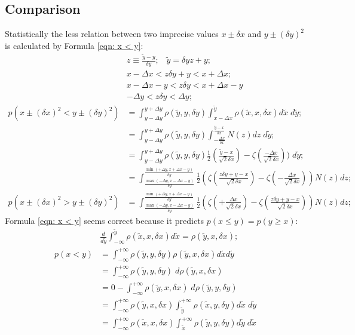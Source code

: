 \documentclass[twoside]{article}
\numberwithin{equation}{section}
\newcommand{\eqspace}{\;\;\;}
\begin{document}
\subsection{Comparison}

\iffalse

Statistically the less relation between two imprecise values $x \pm \delta x$ and $y \pm (\delta y)^2$ is calculated by Formula \ref{eqn: x < y}:
\begin{align}
& z \equiv \frac{\tilde{y} - y}{\delta y}; \eqspace \tilde{y} = \delta y z + y; \\
& x - \Delta x < z \delta y + y < x + \Delta x; \\ & x - \Delta x - y < z \delta y < x + \Delta x - y \\
& - \Delta y < z \delta y < \Delta y; \\
p\left( x \pm (\delta x)^2 < y \pm (\delta y)^2 \right) & = 
  \int_{y - \Delta y}^{y + \Delta y} \rho(\tilde{y}, y, \delta y) 
    \int_{x - \Delta x}^{\tilde{y}} \rho(\tilde{x}, x, \delta x) d \tilde{x} \;d \tilde{y}; \\
& = \int_{y - \Delta y}^{y + \Delta y} \rho(\tilde{y}, y, \delta y) 
  \int_{-\frac{\Delta x}{\delta x}}^{\frac{\tilde{y} - x}{\delta x}} N(z) d z \;d \tilde{y}; \\
& = \int_{y - \Delta y}^{y + \Delta y} \rho(\tilde{y}, y, \delta y) 
      \frac{1}{2}(\frac{\tilde{y} - x}{\sqrt{2} \delta x}) - \zeta(\frac{-\Delta x}{\sqrt{2} \delta x})) \;d \tilde{y}; \\
& = \int_{\frac{\max(-\Delta y, x - \Delta x - y)}{\delta y}}^{\frac{\min(+\Delta y, x + \Delta x - y)}{\delta y}} 
      \frac{1}{2} \left(\zeta(\frac{z \delta y + y - x}{\sqrt{2} \delta x}) - \zeta(-\frac{\Delta x}{\sqrt{2} \delta x})\right) N(z) d z; \\
p\left( x \pm (\delta x)^2 > y \pm (\delta y)^2 \right) & =     
   \int_{\frac{\max(-\Delta y, x - \Delta x - y)}{\delta y}}^{\frac{\min(+\Delta y, x + \Delta x - y)}{\delta y}} 
      \frac{1}{2} \left(\zeta(+\frac{\Delta x}{\sqrt{2} \delta x}) - \zeta(\frac{z \delta y + y - x}{\sqrt{2} \delta x})\right) N(z) d z;
\end{align}
Formula \eqref{eqn: x < y} seems correct because it predicts $p(x \le y) = p(y \ge x)$:
\begin{align}
& \frac{d}{d \tilde{y}} \int_{-\infty}^{\tilde{y}} \rho(\tilde{x}, x, \delta x) d \tilde{x} = \rho(\tilde{y}, x, \delta x); \\
p(x< y) & = \int_{-\infty}^{+\infty} \rho(\tilde{y}, y, \delta y) \rho(\tilde{y}, x, \delta x) d \tilde{x} d \tilde{y} \\
& = \int_{-\infty}^{+\infty} \rho(\tilde{y}, y, \delta y) \;d \rho(\tilde{y}, x, \delta x) \\
& = 0 - \int_{-\infty}^{+\infty} \rho(\tilde{y}, x, \delta x) \;d \rho(\tilde{y}, y, \delta y) \\
& = \int_{-\infty}^{+\infty} \rho(\tilde{y}, x, \delta x) 
\int_{\tilde{y}}^{+\infty} \rho(\tilde{x}, y, \delta y) 
d \tilde{x} \;d \tilde{y} \\
& = \int_{-\infty}^{+\infty} \rho(\tilde{x}, x, \delta x) 
\int_{\tilde{x}}^{+\infty} \rho(\tilde{y}, y, \delta y) 
d \tilde{y} \;d \tilde{x}
\end{align}
\end{document}
